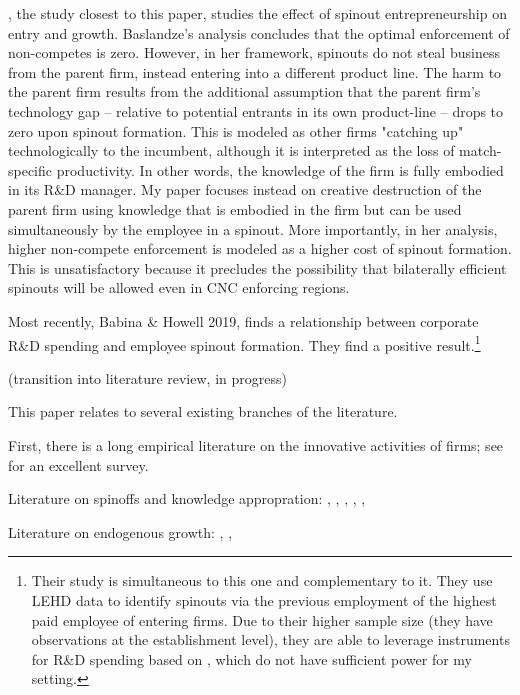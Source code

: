 \documentclass[12pt,english]{article}
\theoremstyle{remark}
\begin{document}
\cite{baslandze_spinout_2019}, the study closest to this paper, studies the effect of spinout entrepreneurship on entry and growth. Baslandze's analysis concludes that the optimal enforcement of non-competes is zero. However, in her framework, spinouts do not steal business from the parent firm, instead entering into a different product line. The harm to the parent firm results from the additional assumption that the parent firm's technology gap -- relative to potential entrants in its own product-line -- drops to zero upon spinout formation. This is modeled as other firms "catching up" technologically to the incumbent, although it is interpreted as the loss of match-specific productivity. In other words, the knowledge of the firm is fully embodied in its R\&D manager. My paper focuses instead on creative destruction of the parent firm using knowledge that is embodied in the firm but can be used simultaneously by the employee in a spinout.  More importantly, in her analysis, higher non-compete enforcement is modeled as a higher cost of spinout formation. This is unsatisfactory because it precludes the possibility that bilaterally efficient spinouts will be allowed even in CNC enforcing regions. 

Most recently, Babina \& Howell 2019, finds a relationship between corporate R\&D spending and employee spinout formation. They find a positive result.\footnote{Their study is simultaneous to this one and complementary to it. They use LEHD data to identify spinouts via the previous employment of the highest paid employee of entering firms. Due to their higher sample size (they have observations at the establishment level), they are able to leverage instruments for R\&D spending based on \cite{bloom_identifying_2013}, which do not have sufficient power for my setting.}

(transition into literature review, in progress)

This paper relates to several existing branches of the literature. 

First, there is a long empirical literature on the innovative activities of firms; see \cite{cohen_fifty_2010} for an excellent survey.

Literature on spinoffs and knowledge appropration: \cite{anton_expropriation_1994}, \cite{anton_start-ups_1995}, \cite{franco_covenants_2008}, \cite{klepper_entry_2005}, \cite{klette_innovating_2004}, \cite{chatterjee_spinoffs_2012}

Literature on endogenous growth: \cite{grossman_quality_1991}, \cite{romer_increasing_1986}, \cite{aghion_model_1992}
\end{document}
